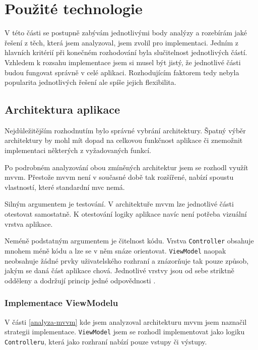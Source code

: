\section{Použité technologie}

V této části se postupně zabývám jednotlivými body analýzy a rozebírám jaké řešení z těch, která jsem analyzoval, jsem zvolil pro implementaci.
Jedním z hlavních kritérií při konečném rozhodování byla slučitelnost jednotlivých částí.
Vzhledem k rozsahu implementace jsem si musel být jistý, že jednotlivé části budou fungovat správně v celé aplikaci.
Rozhodujícím faktorem tedy nebyla popularita jednotlivých řešení ale spíše jejich flexibilita.

\subsection{Architektura aplikace}\label{technologie-architektura}

Nejdůležitějším rozhodnutím bylo správné vybrání architektury.
Špatný výběr architektury by mohl mít dopad na celkovou funkčnost aplikace či znemožnit implementaci některých z vyžadovaných funkcí.

Po podrobném analyzování obou zmíněných architektur jsem se rozhodl využít \acrshort{mvvm}.
Přestože \acrshort{mvvm} není v současné době tak rozšířené, nabízí spoustu vlastností, které standardní \acrshort{mvc} nemá.

Silným argumentem je testování.
V architektuře \acrshort{mvvm} lze jednotlivé části otestovat samostatně.
K otestování logiky aplikace navíc není potřeba vizuální vrstva aplikace.

Neméně podstatným argumentem je čitelnost kódu.
Vrstva \texttt{Controller} obsahuje mnohem méně kódu a lze se v něm snáze orientovat.
\texttt{ViewModel} naopak neobsahuje žádné prvky uživatelského rozhraní a znázorňuje tak pouze způsob, jakým se daná část aplikace chová.
Jednotlivé vrstvy jsou od sebe striktně odděleny a dodržují princip jedné odpovědnosti \cite{toptal-srp}.

\subsubsection*{Implementace ViewModelu}

V části \ref{analyza-mvvm} kde jsem analyzoval architekturu \acrshort{mvvm} jsem naznačil strategii implementace.
\texttt{ViewModel} jsem se rozhodl implementovat jako logiku \texttt{Controlleru}, která jako rozhraní nabízí pouze vstupy či výstupy.

